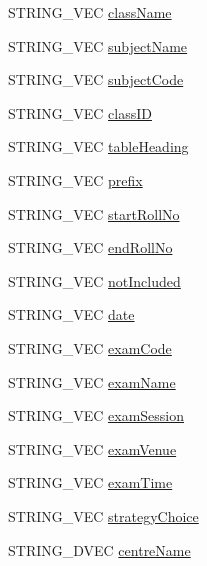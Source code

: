 \begin{DoxyCompactItemize}
\item 
S\-T\-R\-I\-N\-G\-\_\-\-V\-E\-C \hyperlink{classInputDetail_a6ee80d01e417bea608374ba83e17b425}{class\-Name}
\item 
S\-T\-R\-I\-N\-G\-\_\-\-V\-E\-C \hyperlink{classInputDetail_a860676e6e8b258a4cf6265e693194e93}{subject\-Name}
\item 
S\-T\-R\-I\-N\-G\-\_\-\-V\-E\-C \hyperlink{classInputDetail_ab391f03f242defb952e24a584eefdb35}{subject\-Code}
\item 
S\-T\-R\-I\-N\-G\-\_\-\-V\-E\-C \hyperlink{classInputDetail_a67c823f91164f534250751ab8da7b7cf}{class\-I\-D}
\item 
S\-T\-R\-I\-N\-G\-\_\-\-V\-E\-C \hyperlink{classInputDetail_a9adc25a6c332855ee0c2dbd5fd71ca86}{table\-Heading}
\item 
S\-T\-R\-I\-N\-G\-\_\-\-V\-E\-C \hyperlink{classInputDetail_af81c2cdf9b1336634bbb33165921d879}{prefix}
\item 
S\-T\-R\-I\-N\-G\-\_\-\-V\-E\-C \hyperlink{classInputDetail_a7262436753ac62bf068cc23b97049f61}{start\-Roll\-No}
\item 
S\-T\-R\-I\-N\-G\-\_\-\-V\-E\-C \hyperlink{classInputDetail_abc3249eab8fbf895620deff0a9349333}{end\-Roll\-No}
\item 
S\-T\-R\-I\-N\-G\-\_\-\-V\-E\-C \hyperlink{classInputDetail_aba862d64d7f84a385e528d0daf42e9fc}{not\-Included}
\item 
S\-T\-R\-I\-N\-G\-\_\-\-V\-E\-C \hyperlink{classInputDetail_a7d1c7ceb33eb86058e00c3a6a68cae4a}{date}
\item 
S\-T\-R\-I\-N\-G\-\_\-\-V\-E\-C \hyperlink{classInputDetail_ac48c0170ce354d3cd188ddc2e83e2c67}{exam\-Code}
\item 
S\-T\-R\-I\-N\-G\-\_\-\-V\-E\-C \hyperlink{classInputDetail_a7b4e4a2a26f23da75d9928601a88a1d9}{exam\-Name}
\item 
S\-T\-R\-I\-N\-G\-\_\-\-V\-E\-C \hyperlink{classInputDetail_a4501d1379c278965497abf21d369ad9e}{exam\-Session}
\item 
S\-T\-R\-I\-N\-G\-\_\-\-V\-E\-C \hyperlink{classInputDetail_a695928668a413ac052776c0b6cb27501}{exam\-Venue}
\item 
S\-T\-R\-I\-N\-G\-\_\-\-V\-E\-C \hyperlink{classInputDetail_a847dd8bb2f0c43960746cfa4d2310a15}{exam\-Time}
\item 
S\-T\-R\-I\-N\-G\-\_\-\-V\-E\-C \hyperlink{classInputDetail_acbdbb6ecb850dec574b5878764c56c88}{strategy\-Choice}
\item 
S\-T\-R\-I\-N\-G\-\_\-D\-V\-E\-C \hyperlink{classInputDetail_a44d0e743d84bfce178975192fc2ddde7}{centre\-Name}

\end{DoxyCompactItemize}
